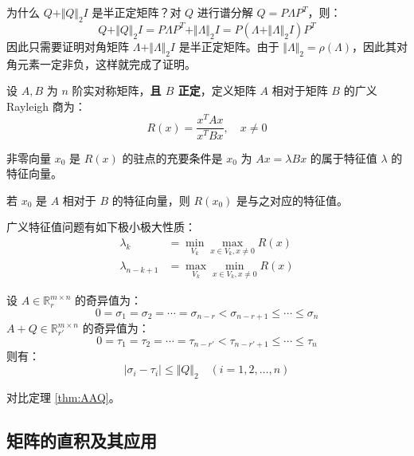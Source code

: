 \begin{remark}
为什么 $Q+\Vert Q\Vert_2I$ 是半正定矩阵？对 $Q$ 进行谱分解 $Q=P\Lambda P^T$，则：
\[
    Q+\Vert Q\Vert_2I=P\Lambda P^T+\Vert\Lambda\Vert_2I=P(\Lambda +\Vert\Lambda\Vert_2I)P^T
\]
因此只需要证明对角矩阵 $\Lambda +\Vert\Lambda\Vert_2I$ 是半正定矩阵。由于 $\Vert\Lambda\Vert_2=\rho(\Lambda)$，因此其对角元素一定非负，这样就完成了证明。
\end{remark}

\begin{definition}[广义 Rayleigh 商]
设 $A,B$ 为 $n$ 阶实对称矩阵，\textbf{且 $B$ 正定}，定义矩阵 $A$ 相对于矩阵 $B$ 的广义 Rayleigh 商为：
\[
    R(x)=\frac{x^TAx}{x^TBx},\quad x\neq 0
\]
\end{definition}
\begin{theorem}
非零向量 $x_0$ 是 $R(x)$ 的驻点的充要条件是 $x_0$ 为 $Ax=\lambda Bx$ 的属于特征值 $\lambda$ 的特征向量。
\end{theorem}

\begin{corollary}
若 $x_0$ 是 $A$ 相对于 $B$ 的特征向量，则 $R(x_0)$ 是与之对应的特征值。
\end{corollary}

\begin{theorem}
广义特征值问题有如下极小极大性质：
\begin{align*}
    \lambda_k&=\min_{V_k}\max_{x\in V_k,x\neq 0}R(x)\\
    \lambda_{n-k+1}&=\max_{V_k}\min_{x\in V_k,x\neq0}R(x)
\end{align*}
\end{theorem}

\begin{theorem}[矩阵奇异值的极性]
设 $A\in\mathbb R^{m\times n}_r$ 的奇异值为：
\[
    0=\sigma_1=\sigma_2=\cdots=\sigma_{n-r}<\sigma_{n-r+1}\leq\cdots\leq\sigma_n
\]
$A+Q\in\mathbb R^{m\times n}_{r'}$ 的奇异值为：
\[
    0=\tau_1=\tau_2=\cdots=\tau_{n-r'}<\tau_{n-r'+1}\leq\cdots\leq\tau_n
\]
则有：
\[
    |\sigma_i-\tau_i|\leq \Vert Q\Vert_2\quad(i=1,2,\ldots,n)
\]
\end{theorem}
\begin{remark} 
对比定理 \ref{thm:AAQ}。
\end{remark}


\subsection{矩阵的直积及其应用}

